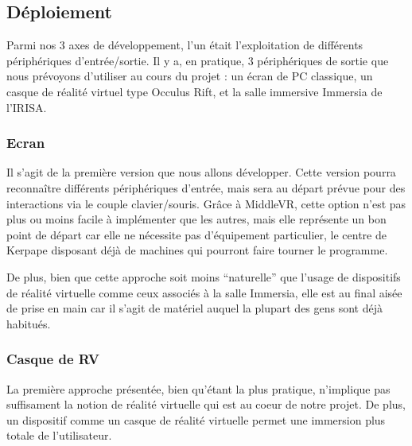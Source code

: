 \subsection{Déploiement}
Parmi nos 3 axes de développement, l'un était l'exploitation de différents périphériques d'entrée/sortie. Il y a, en pratique, 3 périphériques de sortie que nous prévoyons d'utiliser au cours du projet : un écran de PC classique, un casque de réalité virtuel type Occulus Rift, et la salle immersive Immersia de l'IRISA.

\subsubsection{Ecran}
Il s'agit de la première version que nous allons développer. Cette version pourra reconnaître différents périphériques d'entrée, mais sera au départ prévue pour des interactions via le couple clavier/souris. Grâce à MiddleVR, cette option n'est pas plus ou moins facile à implémenter que les autres, mais elle représente un bon point de départ car elle ne nécessite pas d'équipement particulier, le centre de Kerpape disposant déjà de machines qui pourront faire tourner le programme. \newline

De  plus, bien que cette approche soit moins \enquote{naturelle} que l'usage de dispositifs de réalité virtuelle comme ceux associés à la salle Immersia, elle est au final aisée de prise en main car il s'agit de matériel auquel la plupart des gens sont déjà habitués.

\subsubsection{Casque de RV}
La première approche présentée, bien qu'étant la plus pratique, n'implique pas suffisament la notion de réalité virtuelle qui est au coeur de notre projet. De plus, un dispositif comme un casque de réalité virtuelle permet une immersion plus totale de l'utilisateur.

